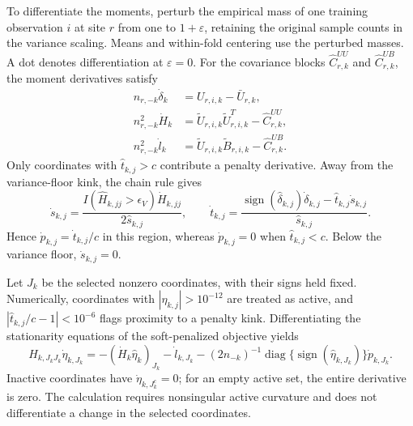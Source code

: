 \documentclass[12pt]{article}
\begin{document}
To differentiate the moments, perturb the empirical mass of one training observation $i$ at site $r$ from one to $1+\varepsilon$, retaining the original sample counts in the variance scaling. Means and within-fold centering use the perturbed masses. A dot denotes differentiation at $\varepsilon=0$. For the covariance blocks $\widehat C_{r,k}^{UU}$ and $\widehat C_{r,k}^{UB}$, the moment derivatives satisfy
\[
\begin{aligned}
n_{r,-k}\dot\delta_k
&=U_{r,i,k}-\bar U_{r,k},\\
n_{r,-k}^2\dot H_k
&=\widetilde U_{r,i,k}\widetilde U_{r,i,k}^T-\widehat C_{r,k}^{UU},\\
n_{r,-k}^2\dot l_k
&=\widetilde U_{r,i,k}\widetilde B_{r,i,k}-\widehat C_{r,k}^{UB}.
\end{aligned}
\]
Only coordinates with $\widehat t_{k,j}>c$ contribute a penalty derivative. Away from the variance-floor kink, the chain rule gives
\[
\dot s_{k,j}=\frac{I(\widehat H_{k,jj}>\epsilon_V)\dot H_{k,jj}}{2\widehat s_{k,j}},
\qquad
\dot t_{k,j}=\frac{\operatorname{sign}(\widehat\delta_{k,j})\dot\delta_{k,j}
-\widehat t_{k,j}\dot s_{k,j}}{\widehat s_{k,j}}.
\]
Hence $\dot p_{k,j}=\dot t_{k,j}/c$ in this region, whereas $\dot p_{k,j}=0$ when $\widehat t_{k,j}<c$. Below the variance floor, $\dot s_{k,j}=0$.

Let $J_k$ be the selected nonzero coordinates, with their signs held fixed. Numerically, coordinates with $|\widehat\eta_{k,j}|>10^{-12}$ are treated as active, and $|\widehat t_{k,j}/c-1|<10^{-6}$ flags proximity to a penalty kink. Differentiating the stationarity equations of the soft-penalized objective yields
\[
\widehat H_{k,J_kJ_k}\dot\eta_{k,J_k}
=-(\dot H_k\widehat\eta_k)_{J_k}-\dot l_{k,J_k}
-(2n_{-k})^{-1}\operatorname{diag}\{\operatorname{sign}(\widehat\eta_{k,J_k})\}\dot p_{k,J_k}.
\]
Inactive coordinates have $\dot\eta_{k,J_k^c}=0$; for an empty active set, the entire derivative is zero. The calculation requires nonsingular active curvature and does not differentiate a change in the selected coordinates.
\end{document}
